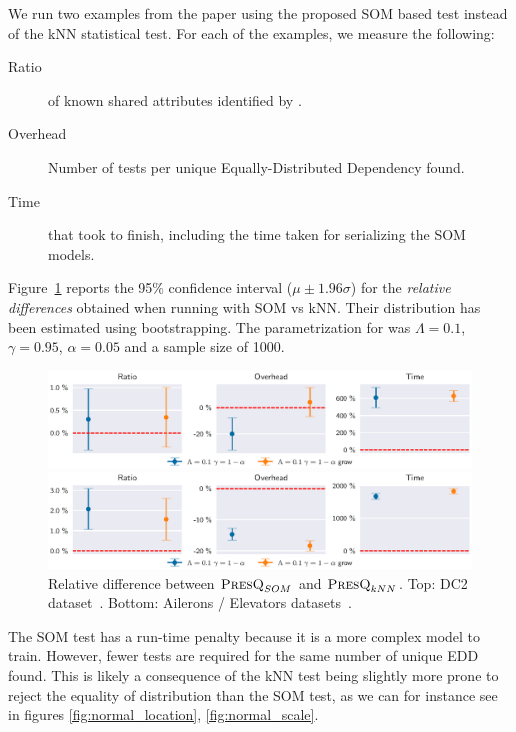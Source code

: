 We run two examples from the \PresQ paper using the proposed \gls{SOM}  based test
instead of the \gls{kNN} statistical test. For each of the examples, we measure the following:

\begin{description}
    \item[Ratio] of known shared attributes identified by \PresQ.
    \item[Overhead] Number of tests per unique Equally-Distributed Dependency found.
    \item[Time] that took \PresQ to finish, including the time taken for serializing the \gls{SOM}  models.
\end{description}

Figure~\ref{fig:presq_som} reports the 95\% confidence interval ($\mu \pm 1.96 \sigma$)
for the \emph{relative differences} obtained when running with \gls{SOM}  vs
\gls{kNN}. Their distribution has been estimated using bootstrapping. The parametrization for
\PresQ was $\Lambda = 0.1$, $\gamma=0.95$, $\alpha=0.05$ and a sample size of 1000.

\begin{figure}[ht]
    \centering
    \includegraphics[width=\textwidth]{images/6_som/presq_som.eps}
    
    \includegraphics[width=\textwidth]{images/6_som/presq_som_aileron.eps}
    \caption[Relative difference between $\PresQ_{SOM}$ and $\PresQ_{kNN}$.]{
        Relative difference between $\PresQ_{SOM}$ and $\PresQ_{kNN}$.
        Top: DC2 dataset~\cite{EuclidDesprez2020}.
        Bottom: Ailerons / Elevators datasets~\cite{alcala2011keel}.
    }
    \label{fig:presq_som}
\end{figure}

The \gls{SOM}  test has a run-time penalty because it is a more complex model to train.
However, fewer tests are required for the same number of unique \gls{EDD} found. This is likely a consequence of
the \gls{kNN} test being slightly more prone to reject the equality of distribution than the \gls{SOM} 
test, as we can for instance see in figures \ref{fig:normal_location}, \ref{fig:normal_scale}.

